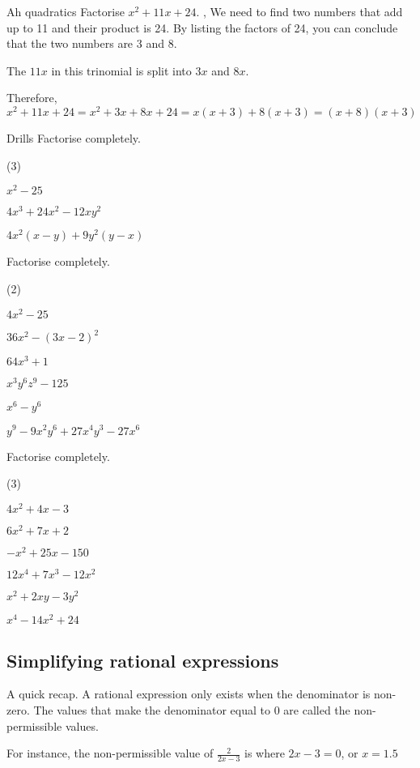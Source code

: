 \begin{example}{Ah quadratics}
Factorise $x^{2}+11x+24$.
\sep
We need to find two numbers that add up to 11 and their product is 24. By listing the factors of 24, you can conclude that the two numbers are 3 and 8.

The $11x$ in this trinomial is split into $3x$ and $8x$.

Therefore, $x^{2}+11x+24=x^{2}+3x+8x+24=x(x+3)+8(x+3)=(x+8)(x+3)$
\end{example}
\begin{questions}{Drills}
Factorise completely.
\begin{question_set}(3)
    \item $x^{2}-25$
    \item $4x^{3}+24x^{2}-12xy^{2}$
    \item $4x^{2}(x-y)+9y^2(y-x)$
\end{question_set}
Factorise completely.
\begin{question_set}(2)
    \item $4x^{2}-25$
    \item $36x^{2}-(3x-2)^{2}$
    \item $64x^{3}+1$
    \item $x^{3}y^{6}z^{9}-125$
    \item $x^{6}-y^{6}$
    \item $y^{9}-9x^{2}y^{6}+27x^{4}y^{3}-27x^{6}$
\end{question_set}
Factorise completely.
\begin{question_set}(3)
    \item $4x^{2}+4x-3$
    \item $6x^{2}+7x+2$
    \item $-x^{2}+25x-150$
    \item $12x^{4}+7x^{3}-12x^{2}$
    \item $x^{2}+2xy-3y^{2}$
    \item $x^{4}-14x^{2}+24$
\end{question_set}
\end{questions}

\subsection{Simplifying rational expressions}
A quick recap. A rational expression only exists when the denominator is non-zero. The values that make the denominator equal to 0 are called the non-permissible values.

For instance, the non-permissible value of $\frac{2}{2x-3}$ is where $2x-3=0$, or $x=1.5$

